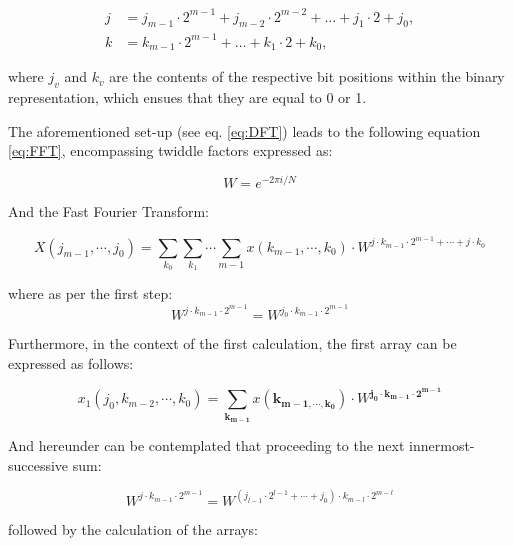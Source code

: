 {\begin{equation}
	\begin{aligned}
		j &= j_{m-1} \cdot 2^{m-1} + j_{m-2} \cdot 2^{m-2} + \dots + j_1 \cdot 2 + j_0, \\
		k &= k_{m-1} \cdot 2^{m-1} + \dots + k_1 \cdot 2 + k_0,
	\end{aligned}
\end{equation}

where \( j_{v} \) and \( k_{v} \) are the contents of the respective bit positions within the binary representation, which ensues that they are equal to 0 or 1.

The aforementioned set-up (see eq. \eqref{eq:DFT}) leads to the following equation \eqref{eq:FFT}, encompassing twiddle factors expressed as:

\begin{equation}
	W = e^{-2\pi i/N}
	\label{eq:twiddle}
\end{equation}

And the Fast Fourier Transform:

\begin{equation}
	X(j_{m-1}, \cdots ,j_0) = \sum_{k_{0}} \sum_{k_{1}} \cdots \sum_{m-1} x({k_{m-1} , \cdots , k_0}) \cdot W^{j \cdot k_{m-1} \cdot 2^{m-1} + \cdots + j \cdot k_0}
	\label{eq:FFT}
\end{equation}

where as per the first step:
\begin{equation}
	W^{j \cdot k_{m-1} \cdot 2^{m-1}} = W^{j_{0} \cdot k_{m-1} \cdot 2^{m-1}}
\end{equation}

Furthermore, in the context of the first calculation, the first array can be expressed as follows:

\begin{equation}
	x_{1}(j_0, k_{m-2}, \cdots, k_0) = \sum_{\mathbf{k_{m-1}}} x(\mathbf{k_{m-1, \cdots, k_0}}) \cdot W^{\mathbf{j_0}  \cdot \mathbf{k_{m-1}} \cdot \mathbf{2^{m-1}} }
\end{equation}

And hereunder can be contemplated that proceeding to the next innermost-successive sum:

\begin{equation}
	W^{j \cdot k_{m-1} \cdot 2^{m-1}} = W^{(j_{l-1} \cdot 2^{l-1} + \cdots + j_0) \cdot k_{m-l} \cdot 2^{m-l}}
\end{equation}

followed by the calculation of the arrays:

}
